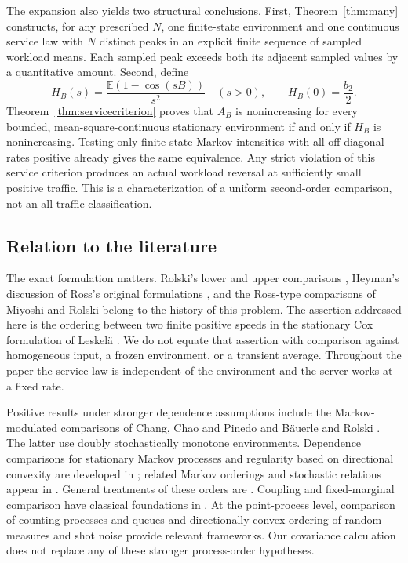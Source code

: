 \documentclass[10pt,a4paper]{amsart}
\numberwithin{equation}{section}
\newcommand{\E}{\mathbb E}
\newcommand{\1}{\mathbf 1}
\begin{document}
The expansion also yields two structural conclusions. First, Theorem~\ref{thm:many} constructs, for any prescribed $N$, one finite-state environment and one continuous service law with $N$ distinct peaks in an explicit finite sequence of sampled workload means. Each sampled peak exceeds both its adjacent sampled values by a quantitative amount. Second, define
\begin{equation}\label{eq:Hintro}
 H_B(s)=\frac{\E(1-\cos(sB))}{s^2}\quad(s>0),
 \qquad H_B(0)=\frac{b_2}{2}.
\end{equation}
Theorem~\ref{thm:servicecriterion} proves that $A_B$ is nonincreasing for every bounded, mean-square-continuous stationary environment if and only if $H_B$ is nonincreasing. Testing only finite-state Markov intensities with all off-diagonal rates positive already gives the same equivalence. Any strict violation of this service criterion produces an actual workload reversal at sufficiently small positive traffic. This is a characterization of a uniform second-order comparison, not an all-traffic classification.

\subsection{Relation to the literature}
The exact formulation matters. Rolski's lower and upper comparisons \cite{Rolski81,Rolski86}, Heyman's discussion of Ross's original formulations \cite{Heyman82}, and the Ross-type comparisons of Miyoshi and Rolski \cite{MR04} belong to the history of this problem. The assertion addressed here is the ordering between two finite positive speeds in the stationary Cox formulation of Leskel\"a \cite{Leskela22}. We do not equate that assertion with comparison against homogeneous input, a frozen environment, or a transient average. Throughout the paper the service law is independent of the environment and the server works at a fixed rate.

Positive results under stronger dependence assumptions include the Markov-modulated comparisons of Chang, Chao and Pinedo \cite{CCP91} and B\"auerle and Rolski \cite{BR98}. The latter use doubly stochastically monotone environments. Dependence comparisons for stationary Markov processes and regularity based on directional convexity are developed in \cite{HuPan00,MS93}; related Markov orderings and stochastic relations appear in \cite{Massey87,Leskela10}. General treatments of these orders are \cite{MullerStoyan02,ShakedShanthikumar07}. Coupling and fixed-marginal comparison have classical foundations in \cite{Strassen65,Tchen80}. At the point-process level, comparison of counting processes and queues \cite{Whitt81} and directionally convex ordering of random measures and shot noise \cite{BY09} provide relevant frameworks. Our covariance calculation does not replace any of these stronger process-order hypotheses.
\end{document}

